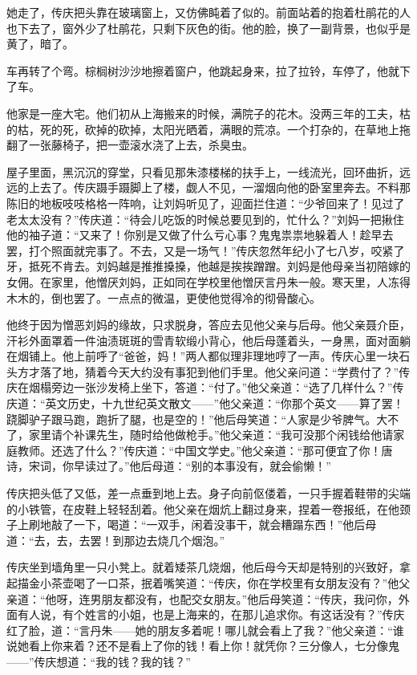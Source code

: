 \documentclass[UTF8]{ctexart}
\begin{document}
她走了，传庆把头靠在玻璃窗上，又仿佛盹着了似的。前面站着的抱着杜鹃花的人也下去了，窗外少了杜鹃花，只剩下灰色的街。他的脸，换了一副背景，也似乎是黄了，暗了。

车再转了个弯。棕榈树沙沙地擦着窗户，他跳起身来，拉了拉铃，车停了，他就下了车。

他家是一座大宅。他们初从上海搬来的时候，满院子的花木。没两三年的工夫，枯的枯，死的死，砍掉的砍掉，太阳光晒着，满眼的荒凉。一个打杂的，在草地上拖翻了一张藤椅子，把一壶滚水浇了上去，杀臭虫。

屋子里面，黑沉沉的穿堂，只看见那朱漆楼梯的扶手上，一线流光，回环曲折，远远的上去了。传庆蹑手蹑脚上了楼，觑人不见，一溜烟向他的卧室里奔去。不料那陈旧的地板吱吱格格一阵响，让刘妈听见了，迎面拦住道：“少爷回来了！见过了老太太没有？”传庆道：“待会儿吃饭的时候总要见到的，忙什么？”刘妈一把揪住他的袖子道：“又来了！你别是又做了什么亏心事？鬼鬼祟祟地躲着人！趁早去罢，打个照面就完事了。不去，又是一场气！”传庆忽然年纪小了七八岁，咬紧了牙，抵死不肯去。刘妈越是推推搡搡，他越是挨挨蹭蹭。刘妈是他母亲当初陪嫁的女佣。在家里，他憎厌刘妈，正如同在学校里他憎厌言丹朱一般。寒天里，人冻得木木的，倒也罢了。一点点的微温，更使他觉得冷的彻骨酸心。

他终于因为憎恶刘妈的缘故，只求脱身，答应去见他父亲与后母。他父亲聂介臣，汗衫外面罩着一件油渍斑斑的雪青软缎小背心，他后母蓬着头，一身黑，面对面躺在烟铺上。他上前呼了“爸爸，妈！”两人都似理非理地哼了一声。传庆心里一块石头方才落了地，猜着今天大约没有事犯到他们手里。他父亲问道：“学费付了？”传庆在烟榻旁边一张沙发椅上坐下，答道：“付了。”他父亲道：“选了几样什么？”传庆道：“英文历史，十九世纪英文散文——”他父亲道：“你那个英文——算了罢！跷脚驴子跟马跑，跑折了腿，也是空的！”他后母笑道：“人家是少爷脾气。大不了，家里请个补课先生，随时给他做枪手。”他父亲道：“我可没那个闲钱给他请家庭教师。还选了什么？”传庆道：“中国文学史。”他父亲道：“那可便宜了你！唐诗，宋词，你早读过了。”他后母道：“别的本事没有，就会偷懒！”

传庆把头低了又低，差一点垂到地上去。身子向前伛偻着，一只手握着鞋带的尖端的小铁管，在皮鞋上轻轻刮着。他父亲在烟炕上翻过身来，捏着一卷报纸，在他颈子上刷地敲了一下，喝道：“一双手，闲着没事干，就会糟蹋东西！”他后母道：“去，去，去罢！到那边去烧几个烟泡。”

传庆坐到墙角里一只小凳上。就着矮茶几烧烟，他后母今天却是特别的兴致好，拿起描金小茶壶喝了一口茶，抿着嘴笑道：“传庆，你在学校里有女朋友没有？”他父亲道：“他呀，连男朋友都没有，也配交女朋友。”他后母笑道：“传庆，我问你，外面有人说，有个姓言的小姐，也是上海来的，在那儿追求你。有这话没有？”传庆红了脸，道：“言丹朱——她的朋友多着呢！哪儿就会看上了我？”他父亲道：“谁说她看上你来着？还不是看上了你的钱！看上你！就凭你？三分像人，七分像鬼——”传庆想道：“我的钱？我的钱？”
\end{document}
